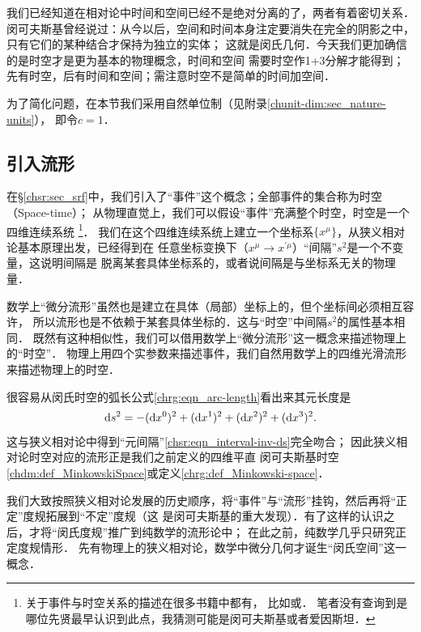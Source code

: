 我们已经知道在相对论中时间和空间已经不是绝对分离的了，两者有着密切关系．
闵可夫斯基曾经说过：从今以后，空间和时间本身注定要消失在完全的阴影之中，只有它们的某种结合才保持为独立的实体；
这就是闵氏几何．今天我们更加确信的是{\kaishu 时空}才是更为基本的物理概念，时间和空间
需要时空作1+3分解才能得到；先有时空，后有时间和空间；需注意时空不是简单的时间加空间．


为了简化问题，在本节我们采用自然单位制（见附录\ref{chunit-dim:sec_nature-units}），
即令$c=1$． %

\subsection{引入流形}
在\S \ref{chsr:sec_srf}中，我们引入了“事件”这个概念；全部事件的集合称为{\heiti 时空}（Space-time）；
从物理直觉上，我们可以假设“事件”充满整个时空，时空是一个四维连续系统
{\footnote{关于事件与时空关系的描述在很多书籍中都有，
比如\parencite[\S 3.2]{synge-1960}或\parencite[\S 3.1]{hawking-ellis1973}．
笔者没有查询到是哪位先贤最早认识到此点，我猜测可能是闵可夫斯基或者爱因斯坦．}}．
我们在这个四维连续系统上建立一个坐标系$\{x^\mu\}$，从狭义相对论基本原理出发，已经得到在
任意坐标变换下（$x^\mu \to x^{\prime \mu}$）“间隔”$s^2$是一个不变量，这说明间隔是
脱离某套具体坐标系的，或者说间隔是与坐标系无关的物理量．

数学上“微分流形”虽然也是建立在具体（局部）坐标上的，但个坐标间必须相互容许，
所以流形也是不依赖于某套具体坐标的．这与“时空”中间隔$s^2$的属性基本相同．
既然有这种相似性，我们可以借用数学上“微分流形”这一概念来描述物理上的“时空”．
物理上用四个实参数来描述事件，我们自然用数学上的四维光滑流形来描述物理上的时空．

很容易从闵氏时空的弧长公式\eqref{chrg:eqn_arc-length}看出来其元长度是
\begin{equation}
    {\rm d}s^2 = -({\rm d}x^0)^2 +({\rm d}x^1)^2 +({\rm d}x^2)^2 +({\rm d}x^3)^2 .
\end{equation}
这与狭义相对论中得到“元间隔”\eqref{chsr:eqn_interval-inv-ds}完全吻合；
因此狭义相对论时空对应的流形正是我们之前定义的四维平直
闵可夫斯基时空\ref{chdm:def_MinkowskiSpace}或定义\ref{chrg:def_Minkowski-space}．

我们大致按照狭义相对论发展的历史顺序，将“事件”与“流形”挂钩，然后再将“正定”度规拓展到“不定”度规（这
是闵可夫斯基的重大发现）．有了这样的认识之后，才将“闵氏度规”推广到纯数学的流形论中；
在此之前，纯数学几乎只研究正定度规情形．
先有物理上的狭义相对论，数学中微分几何才诞生“闵氏空间”这一概念．



